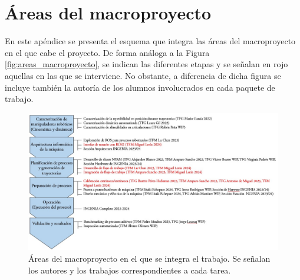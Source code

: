 \chapter{Áreas del macroproyecto}
\label{cap: anexo marco proyecto}

En este apéndice se presenta el esquema que integra las áreas del macroproyecto en el que cabe el proyecto. De forma análoga a la Figura \ref{fig:areas_macroproyecto}, se indican las diferentes etapas y se señalan en rojo aquellas en las que se interviene. No obstante, a diferencia de dicha figura se incluye también la autoría de los alumnos involucrados en cada paquete de trabajo.

\begin{landscape}
\begin{figure}[H]
    \centering
    \includegraphics[scale=0.85, angle=0]{figuras/marco_proyecto_tareas_y_autor.JPG}
    \caption{Áreas del macroproyecto en el que se integra el trabajo. Se señalan los autores y los trabajos correspondientes a cada tarea.}
    \label{fig:marco proyecto tareas y autor}
\end{figure}
\end{landscape}